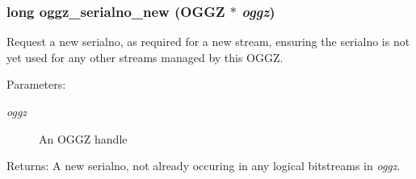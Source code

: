 \subsubsection{\setlength{\rightskip}{0pt plus 5cm}long oggz\_\-serialno\_\-new ({\bf OGGZ} $\ast$ {\em oggz})}\label{oggz_8h_a27}


Request a new serialno, as required for a new stream, ensuring the serialno is not yet used for any other streams managed by this OGGZ. 

\begin{Desc}
\item[Parameters:]
\begin{description}
\item[{\em oggz}]An OGGZ handle \end{description}
\end{Desc}
\begin{Desc}
\item[Returns:]A new serialno, not already occuring in any logical bitstreams in {\em oggz\/}. \end{Desc}
